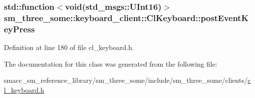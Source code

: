\subsubsection[{\texorpdfstring{post\+Event\+Key\+Press}{postEventKeyPress}}]{\setlength{\rightskip}{0pt plus 5cm}std\+::function$<$void(std\+\_\+msgs\+::\+U\+Int16)$>$ sm\+\_\+three\+\_\+some\+::keyboard\+\_\+client\+::\+Cl\+Keyboard\+::post\+Event\+Key\+Press}\hypertarget{classsm__three__some_1_1keyboard__client_1_1ClKeyboard_a36efb98dcd78795abf90c9fb00a9f170}{}\label{classsm__three__some_1_1keyboard__client_1_1ClKeyboard_a36efb98dcd78795abf90c9fb00a9f170}


Definition at line 180 of file cl\+\_\+keyboard.\+h.



The documentation for this class was generated from the following file\+:\begin{DoxyCompactItemize}
\item 
smacc\+\_\+sm\+\_\+reference\+\_\+library/sm\+\_\+three\+\_\+some/include/sm\+\_\+three\+\_\+some/clients/\hyperlink{cl__keyboard_8h}{cl\+\_\+keyboard.\+h}\end{DoxyCompactItemize}
